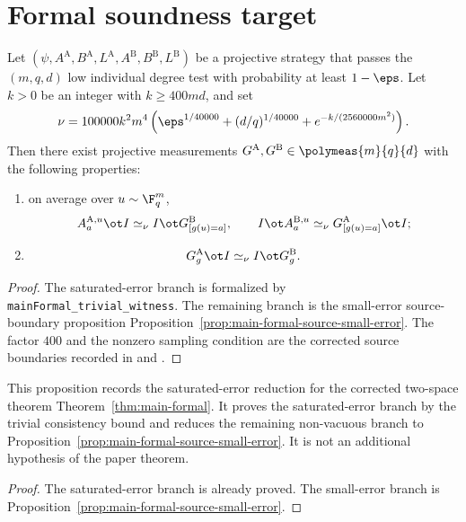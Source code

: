 \section{Formal soundness target}

\begin{theorem}\label{thm:main-formal}
	\leanok
	Let $(\psi, A^{\mathrm A}, B^{\mathrm A}, L^{\mathrm A},
	A^{\mathrm B}, B^{\mathrm B}, L^{\mathrm B})$ be a projective strategy that
	passes the $(m,q,d)$ low individual degree test with probability at least
	$1-\eps$. Let \(k>0\) be an integer with \(k \ge 400md\), and set
	\[
		\nu = 100000 k^2 m^4\left(\eps^{1/40000} + (d/q)^{1/40000} + e^{-k/(2560000m^2)}\right).
	\]
	Then there exist projective measurements
	$G^{\mathrm A}, G^{\mathrm B} \in \polymeas{m}{q}{d}$ with the following
	properties:
	\begin{enumerate}
		\item on average over $u \sim \F_q^m$,
		      \[
			      A_a^{\mathrm A,u} \ot I \simeq_\nu I \ot G^{\mathrm B}_{[g(u)=a]},
			      \qquad
			      I \ot A_a^{\mathrm B,u} \simeq_\nu G^{\mathrm A}_{[g(u)=a]} \ot I;
		      \]
		\item
		      \[
			      G_g^{\mathrm A} \ot I \simeq_\nu I \ot G_g^{\mathrm B}.
		      \]
	\end{enumerate}
\end{theorem}
\begin{proof}
	\leanok
	The saturated-error branch is formalized by
	\texttt{mainFormal\_trivial\_witness}.  The remaining branch is the
	small-error source-boundary proposition
	Proposition~\ref{prop:main-formal-source-small-error}.  The
	factor \(400\) and the nonzero sampling condition are the corrected source
	boundaries recorded in \cite{gap:issue-906-main-formal-k-bound} and
	\cite{gap:issue-422-main-formal-zero-k-boundary}.
\end{proof}

\begin{proposition}\label{prop:main-formal-source-reduction}
	\leanok
	This proposition records the saturated-error reduction for the corrected
	two-space theorem
	Theorem~\ref{thm:main-formal}.  It proves the saturated-error branch by the
	trivial consistency bound and reduces the remaining non-vacuous branch to
	Proposition~\ref{prop:main-formal-source-small-error}.  It is not
	an additional hypothesis of the paper theorem.
\end{proposition}
\begin{proof}
	\leanok
	The saturated-error branch is already proved.  The small-error branch is
	Proposition~\ref{prop:main-formal-source-small-error}.
\end{proof}

